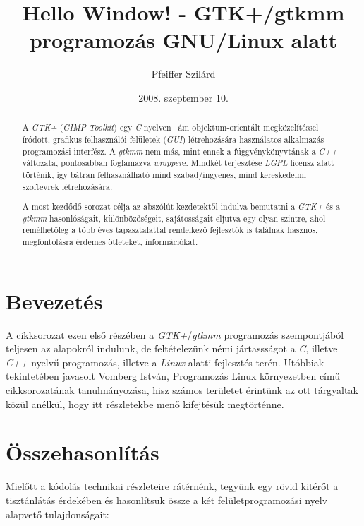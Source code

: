 \documentclass[a4paper,10pt]{article}
\title{Hello Window! - GTK+/gtkmm programozás GNU/Linux alatt}
\author{Pfeiffer Szilárd}
\date{2008. szeptember 10.}
\begin{document}
\maketitle

\begin{abstract}
A \textit{GTK+} (\textit{GIMP Toolkit}) egy \textit{C} nyelven --ám objektum-orientált meg\-kö\-ze\-lí\-tés\-sel-- íródott, grafikus felhasználói felületek (\textit{GUI}) létrehozására használatos al\-kal\-ma\-zás-programozási interfész. A \textit{gtkmm} nem más, mint ennek a függvénykönyvtának a \textit{C++} változata, pontosabban foglamazva \textit{wrapper}e. Mindkét terjesztése \textit{LGPL} licensz alatt történik, így bátran felhasználható mind szabad/ingyenes, mind kereskedelmi szoftevrek létrehozására.

A most kezdődő sorozat célja az abszólút kezdetektől indulva bemutatni a \textit{GTK+} és a \textit{gtkmm} hasonlóságait, különbözőségeit, sajátosságait eljutva egy olyan szintre, ahol remélhetőleg a több éves tapasztalattal rendelkező fejlesztők is találnak hasznos, megfontolásra érdemes ötleteket, információkat.
\end{abstract}

\newpage

\section{Bevezetés}

A cikksorozat ezen első részében a \textit{GTK+}/\textit{gtkmm} programozás szempontjából teljesen az alapokról indulunk, de feltételezünk némi jártassságot a \textit{C}, illetve \textit{C++} nyelvű programozás, illetve a \textit{Linux} alatti fejlesztés terén. Utóbbiak tekintetében javasolt Vomberg István, Programozás Linux környezetben című cikksorozatának tanulmányozása, hisz számos területet érintünk az ott tárgyaltak közül anélkül, hogy itt részletekbe menő kifejtésük megtörténne.

\section{Összehasonlítás}

Mielőtt a kódolás technikai részleteire rátérnénk, tegyünk egy rövid kitérőt a tisztánlátás érdekében és hasonlítsuk össze a két felületprogramozási nyelv alapvető tulajdonságait:\vspace{16pt}
\end{document}
